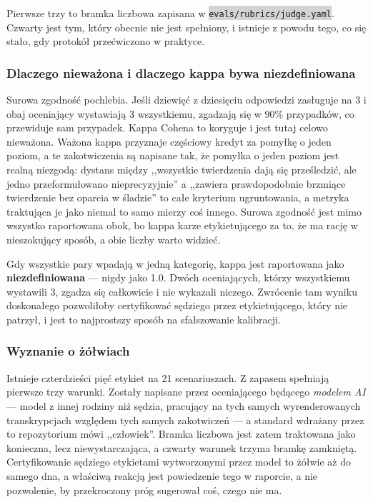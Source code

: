 \documentclass[11pt,a4paper]{article}
\newcommand{\repopath}[1]{\colorbox{lightgray}{\texttt{#1}}}
\begin{document}
Pierwsze trzy to bramka liczbowa zapisana w \repopath{evals/rubrics/judge.yaml}. Czwarty jest tym, który obecnie nie jest spełniony, i istnieje z powodu tego, co się stało, gdy protokół przećwiczono w praktyce.

\subsubsection*{Dlaczego nieważona i dlaczego kappa bywa niezdefiniowana}

Surowa zgodność pochlebia. Jeśli dziewięć z dziesięciu odpowiedzi zasługuje na 3 i obaj oceniający wystawiają 3 wszystkiemu, zgadzają się w 90\% przypadków, co przewiduje sam przypadek. Kappa Cohena to koryguje i jest tutaj celowo nieważona. Ważona kappa przyznaje częściowy kredyt za pomyłkę o jeden poziom, a te zakotwiczenia są napisane tak, że pomyłka o jeden poziom jest realną niezgodą: dystans między ,,wszystkie twierdzenia dają się prześledzić, ale jedno przeformułowano nieprecyzyjnie'' a ,,zawiera prawdopodobnie brzmiące twierdzenie bez oparcia w śladzie'' to całe kryterium ugruntowania, a metryka traktująca je jako niemal to samo mierzy coś innego. Surowa zgodność jest mimo wszystko raportowana obok, bo kappa karze etykietującego za to, że ma rację w nieszokujący sposób, a obie liczby warto widzieć.

Gdy wszystkie pary wpadają w jedną kategorię, kappa jest raportowana jako \textbf{niezdefiniowana} --- nigdy jako 1.0. Dwóch oceniających, którzy wszystkiemu wystawili 3, zgadza się całkowicie i nie wykazali niczego. Zwrócenie tam wyniku doskonałego pozwoliłoby certyfikować sędziego przez etykietującego, który nie patrzył, i jest to najprostszy sposób na sfałszowanie kalibracji.

\subsubsection*{Wyznanie o żółwiach}

Istnieje czterdzieści pięć etykiet na 21 scenariuszach. Z zapasem spełniają pierwsze trzy warunki. Zostały napisane przez oceniającego będącego \emph{modelem AI} --- model z innej rodziny niż sędzia, pracujący na tych samych wyrenderowanych transkrypcjach względem tych samych zakotwiczeń --- a standard wdrażany przez to repozytorium mówi ,,człowiek''. Bramka liczbowa jest zatem traktowana jako konieczna, lecz niewystarczająca, a czwarty warunek trzyma bramkę zamkniętą. Certyfikowanie sędziego etykietami wytworzonymi przez model to żółwie aż do samego dna, a właściwą reakcją jest powiedzenie tego w raporcie, a nie pozwolenie, by przekroczony próg sugerował coś, czego nie ma.
\end{document}
